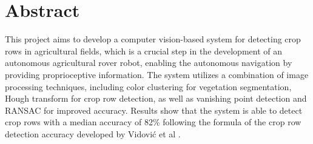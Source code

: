 \chapter*{Abstract}

This project aims to develop a computer vision-based system for detecting crop rows in agricultural fields, which is a crucial step in the development of an autonomous agricultural rover robot, enabling the autonomous navigation by providing proprioceptive information. The system utilizes a combination of image processing techniques, including color clustering for vegetation segmentation, Hough transform for crop row detection, as well as vanishing point detection and RANSAC for improved accuracy. Results show that the system is able to detect crop rows with a median accuracy of 82\% following the formula of the crop row detection accuracy developed by Vidović et al \cite{CRBD}. 